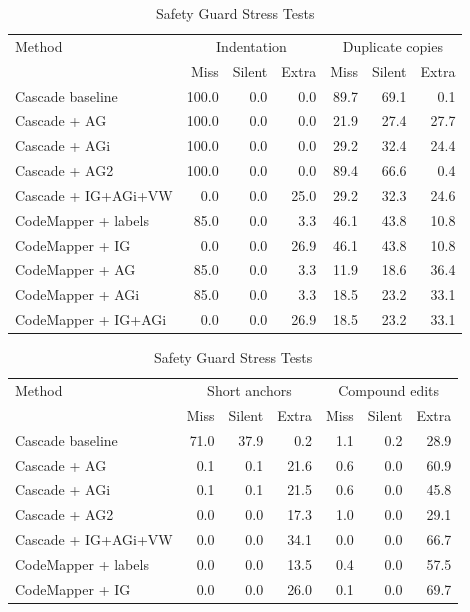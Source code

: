 \documentclass[10pt,conference,letterpaper]{IEEEtran}
\begin{document}
\begin{table}[!t]
\caption{Safety Guard Stress Tests}
\label{tab:guard-stress}
\centering\footnotesize\setlength{\tabcolsep}{4.3pt}
\renewcommand{\arraystretch}{1.12}
\begin{tabular}{lrrrrrr}
\hline
Method & \multicolumn{3}{c}{Indentation} & \multicolumn{3}{c}{Duplicate copies} \\
 & Miss & Silent & Extra & Miss & Silent & Extra \\
\hline
Cascade baseline & 100.0 & 0.0 & 0.0 & 89.7 & 69.1 & 0.1 \\
Cascade + AG & 100.0 & 0.0 & 0.0 & 21.9 & 27.4 & 27.7 \\
Cascade + AGi & 100.0 & 0.0 & 0.0 & 29.2 & 32.4 & 24.4 \\
Cascade + AG2 & 100.0 & 0.0 & 0.0 & 89.4 & 66.6 & 0.4 \\
Cascade + IG+AGi+VW & 0.0 & 0.0 & 25.0 & 29.2 & 32.3 & 24.6 \\
CodeMapper + labels & 85.0 & 0.0 & 3.3 & 46.1 & 43.8 & 10.8 \\
CodeMapper + IG & 0.0 & 0.0 & 26.9 & 46.1 & 43.8 & 10.8 \\
CodeMapper + AG & 85.0 & 0.0 & 3.3 & 11.9 & 18.6 & 36.4 \\
CodeMapper + AGi & 85.0 & 0.0 & 3.3 & 18.5 & 23.2 & 33.1 \\
CodeMapper + IG+AGi & 0.0 & 0.0 & 26.9 & 18.5 & 23.2 & 33.1 \\
\hline
\end{tabular}
\par\vspace{6pt}
\begin{tabular}{lrrrrrr}
\hline
Method & \multicolumn{3}{c}{Short anchors} & \multicolumn{3}{c}{Compound edits} \\
 & Miss & Silent & Extra & Miss & Silent & Extra \\
\hline
Cascade baseline & 71.0 & 37.9 & 0.2 & 1.1 & 0.2 & 28.9 \\
Cascade + AG & 0.1 & 0.1 & 21.6 & 0.6 & 0.0 & 60.9 \\
Cascade + AGi & 0.1 & 0.1 & 21.5 & 0.6 & 0.0 & 45.8 \\
Cascade + AG2 & 0.0 & 0.0 & 17.3 & 1.0 & 0.0 & 29.1 \\
Cascade + IG+AGi+VW & 0.0 & 0.0 & 34.1 & 0.0 & 0.0 & 66.7 \\
CodeMapper + labels & 0.0 & 0.0 & 13.5 & 0.4 & 0.0 & 57.5 \\
CodeMapper + IG & 0.0 & 0.0 & 26.0 & 0.1 & 0.0 & 69.7 \\

\end{tabular}
\end{table}
\end{document}
